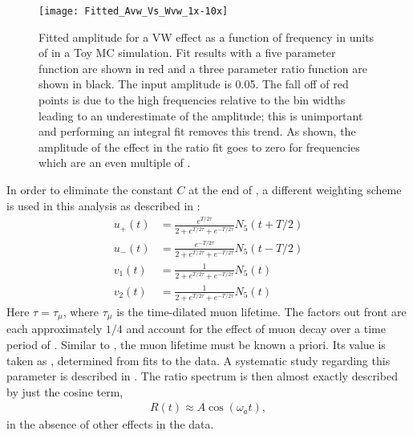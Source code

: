 


    \begin{figure}[ht]
        \centering
        \texttt{[image: Fitted\_Avw\_Vs\_Wvw\_1x-10x]}
        \caption[Cancellation of effect in Ratio Method versus frequency]{Fitted amplitude for a VW effect as a function of frequency in units of \wa in a Toy MC simulation. Fit results with a five parameter function are shown in red and a three parameter ratio function are shown in black. The input amplitude is 0.05. The fall off of red points is due to the high frequencies relative to the bin widths leading to an underestimate of the amplitude; this is unimportant and performing an integral fit removes this trend. As shown, the amplitude of the effect in the ratio fit goes to zero for frequencies which are an even multiple of \wa.}
        \label{fig:CancellationInRatioMethod}
    \end{figure}



 In order to eliminate the constant $C$ at the end of , a different weighting scheme is used in this analysis as described in :
    \begin{equation}
    \begin{aligned}
        u_{+}(t) &= \frac{e^{T/2\tau}}{2 + e^{T/2\tau} + e^{-T/2\tau}} N_{5}(t+T/2) \\
        u_{-}(t) &= \frac{e^{-T/2\tau}}{2 + e^{T/2\tau} + e^{-T/2\tau}} N_{5}(t-T/2) \\
        v_{1}(t) &= \frac{1}{2 + e^{T/2\tau} + e^{-T/2\tau}} N_{5}(t) \\
        v_{2}(t) &= \frac{1}{2 + e^{T/2\tau} + e^{-T/2\tau}} N_{5}(t)
    \label{eqn:fourHistsInText}
    \end{aligned}
    \end{equation}
Here $\tau = \tau_{\mu}$, where $\tau_{\mu}$ is the time-dilated muon lifetime. The factors out front are each approximately $1/4$ and account for the effect of muon decay over a time period of \Tatwo. Similar to \Ta, the muon lifetime must be known a priori. Its value is taken as , determined from fits to the data. A systematic study regarding this parameter is described in . The ratio spectrum is then almost exactly described by just the cosine term,
    \begin{align} \label{eq:threeparamratio}
        R(t) \approx A \cos(\omega_{a}t),
    \end{align}
in the absence of other effects in the data. 




